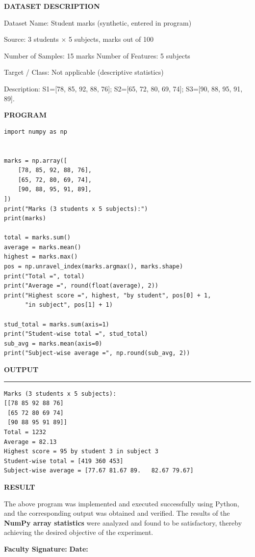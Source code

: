 \documentclass[11pt,twoside]{article}
\newcommand{\expheading}[1]{{\fontsize{14}{17}\selectfont\textbf{#1}\par}}
\begin{document}
{\expheading{DATASET DESCRIPTION}
\vspace{4pt}
\noindent Dataset Name: Student marks (synthetic, entered in program)\par
\noindent Source: 3 students $\times$ 5 subjects, marks out of 100\par
\noindent Number of Samples: 15 marks \hspace{0.3cm} Number of Features: 5 subjects\par
\noindent Target / Class: Not applicable (descriptive statistics)\par
\noindent Description: S1=[78, 85, 92, 88, 76]; S2=[65, 72, 80, 69, 74]; S3=[90, 88, 95, 91, 89]. \par
\vspace{4pt}
} %

\newpage
\expheading{PROGRAM}
\vspace{6pt}

\begin{lstlisting}
import numpy as np


marks = np.array([
    [78, 85, 92, 88, 76],
    [65, 72, 80, 69, 74],
    [90, 88, 95, 91, 89],
])
print("Marks (3 students x 5 subjects):")
print(marks)

total = marks.sum()
average = marks.mean()
highest = marks.max()
pos = np.unravel_index(marks.argmax(), marks.shape)
print("Total =", total)
print("Average =", round(float(average), 2))
print("Highest score =", highest, "by student", pos[0] + 1,
      "in subject", pos[1] + 1)

stud_total = marks.sum(axis=1)
print("Student-wise total =", stud_total)
sub_avg = marks.mean(axis=0)
print("Subject-wise average =", np.round(sub_avg, 2))
\end{lstlisting}

\newpage
\expheading{OUTPUT}
\vspace{2pt}
\noindent\rule{\textwidth}{0.5pt}\par
\vspace{4pt}
\begin{verbatim}
Marks (3 students x 5 subjects):
[[78 85 92 88 76]
 [65 72 80 69 74]
 [90 88 95 91 89]]
Total = 1232
Average = 82.13
Highest score = 95 by student 3 in subject 3
Student-wise total = [419 360 453]
Subject-wise average = [77.67 81.67 89.   82.67 79.67]
\end{verbatim}
\vspace{4pt}

\expheading{RESULT}
\vspace{4pt}
{\fontsize{12}{15}\selectfont
The above program was implemented and executed successfully using Python, and the corresponding output was obtained and verified. The results of the \textbf{NumPy array statistics} were analyzed and found to be satisfactory, thereby achieving the desired objective of the experiment.\par
}

\vspace{12pt}

\noindent\textbf{Faculty Signature:} \underline{\hspace{3.6cm}} \hfill \textbf{Date:} \underline{\hspace{2.8cm}}\par
\end{document}
